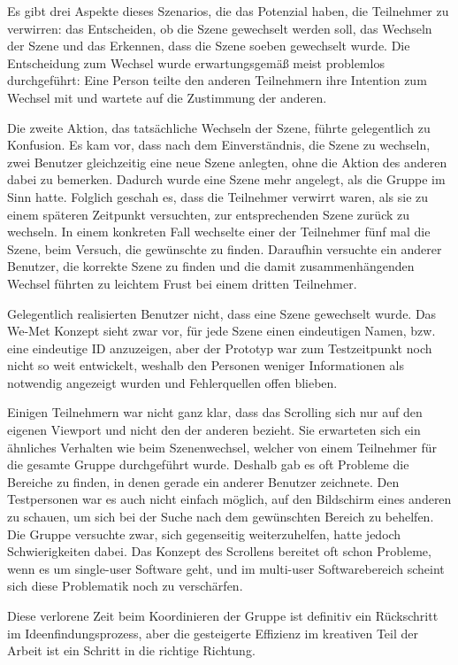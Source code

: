 \begin{itemize}
	Es gibt drei Aspekte dieses Szenarios, die das Potenzial haben, die Teilnehmer zu verwirren: das Entscheiden, ob die Szene gewechselt werden soll, das Wechseln der Szene und das Erkennen, dass die Szene soeben gewechselt wurde. Die Entscheidung zum Wechsel wurde erwartungsgemäß meist problemlos durchgeführt: Eine Person teilte den anderen Teilnehmern ihre Intention zum Wechsel mit und wartete auf die Zustimmung der anderen.
	
	Die zweite Aktion, das tatsächliche Wechseln der Szene, führte gelegentlich zu Konfusion. Es kam vor, dass nach dem Einverständnis, die Szene zu wechseln, zwei Benutzer gleichzeitig eine neue Szene anlegten, ohne die Aktion des anderen dabei zu bemerken. Dadurch wurde eine Szene mehr angelegt, als die Gruppe im Sinn hatte. Folglich geschah es, dass die Teilnehmer verwirrt waren, als sie zu einem späteren Zeitpunkt versuchten, zur entsprechenden Szene zurück zu wechseln. In einem konkreten Fall wechselte einer der Teilnehmer fünf mal die Szene, beim Versuch, die gewünschte zu finden. Daraufhin versuchte ein anderer Benutzer, die korrekte Szene zu finden und die damit zusammenhängenden Wechsel führten zu leichtem Frust bei einem dritten Teilnehmer.
	
	Gelegentlich realisierten Benutzer nicht, dass eine Szene gewechselt wurde. Das We-Met Konzept sieht zwar vor, für jede Szene einen eindeutigen Namen, bzw. eine eindeutige ID anzuzeigen, aber der Prototyp war zum Testzeitpunkt noch nicht so weit entwickelt, weshalb den Personen weniger Informationen als notwendig angezeigt wurden und Fehlerquellen offen blieben.
	
	Einigen Teilnehmern war nicht ganz klar, dass das Scrolling sich nur auf den eigenen Viewport und nicht den der anderen bezieht. Sie erwarteten sich ein ähnliches Verhalten wie beim Szenenwechsel, welcher von einem Teilnehmer für die gesamte Gruppe durchgeführt wurde. Deshalb gab es oft Probleme die Bereiche zu finden, in denen gerade ein anderer Benutzer zeichnete. Den Testpersonen war es auch nicht einfach möglich, auf den Bildschirm eines anderen zu schauen, um sich bei der Suche nach dem gewünschten Bereich zu behelfen. Die Gruppe versuchte zwar, sich gegenseitig weiterzuhelfen, hatte jedoch Schwierigkeiten dabei. Das Konzept des Scrollens bereitet oft schon Probleme, wenn es um single-user Software geht, und im multi-user Softwarebereich scheint sich diese Problematik noch zu verschärfen.
	
	Diese verlorene Zeit beim Koordinieren der Gruppe ist definitiv ein Rückschritt im Ideenfindungsprozess, aber die gesteigerte Effizienz im kreativen Teil der Arbeit ist ein Schritt in die richtige Richtung.
\end{itemize}

